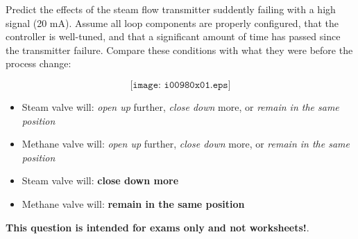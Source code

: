 

Predict the effects of the steam flow transmitter suddently failing with a high signal (20 mA).  Assume all loop components are properly configured, that the controller is well-tuned, and that a significant amount of time has passed since the transmitter failure.  Compare these conditions with what they were before the process change:

$$\texttt{[image: i00980x01.eps]}$$

\begin{itemize}
\item{} Steam valve will: {\it open up} further, {\it close down} more, or {\it remain in the same position} 
\vskip 10pt
\item{} Methane valve will: {\it open up} further, {\it close down} more, or {\it remain in the same position} 
\end{itemize}







\begin{itemize}
\item{} Steam valve will: {\bf close down more} 
\vskip 5pt
\item{} Methane valve will: {\bf remain in the same position}
\end{itemize}







{\bf This question is intended for exams only and not worksheets!}.



